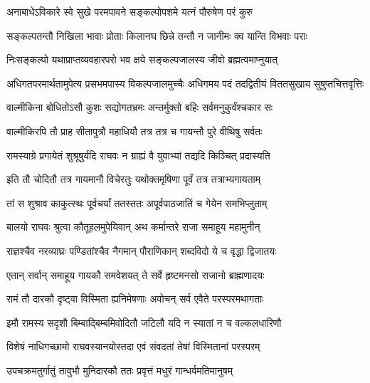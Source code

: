 \twolineshloka
{अनाबाधेऽविकारे स्वे सुखे परमपावने}
{सङ्कल्पोपशमे यत्नं पौरुषेण परं कुरु} %

\twolineshloka
{सङ्कल्पतन्तौ निखिला भावाः प्रोताः किलानघ}
{छिन्ने तन्तौ न जानीमः क्व यान्ति विभवाः पराः} %

\twolineshloka
{निःसङ्कल्पो यथाप्राप्तव्यवहारपरो भव}
{क्षये सङ्कल्पजालस्य जीवो ब्रह्मत्वमाप्नुयात्} %

\fourlineindentedshloka
{अधिगतपरमार्थतामुपेत्य}
{प्रसभमपास्य विकल्पजालमुच्चैः}
{अधिगमय पदं तदद्वितीयं}
{विततसुखाय सुषुप्तचित्तवृत्तिः} %






\twolineshloka
{वाल्मीकिना बोधितोऽसौ कुशः सद्योगतभ्रमः}
{अन्तर्मुक्तो बहिः सर्वमनुकुर्वंश्चकार सः} %

\twolineshloka
{वाल्मीकिरपि तौ प्राह सीतापुत्रौ महाधियौ}
{तत्र तत्र च गायन्तौ पुरे वीथिषु सर्वतः} %

\twolineshloka
{रामस्याग्रे प्रगायेतं शुश्रूषुर्यदि राघवः}
{न ग्राह्यं वै युवाभ्यां तद्यदि किञ्चित् प्रदास्यति} %

\twolineshloka
{इति तौ चोदितौ तत्र गायमानौ विचेरतुः}
{यथोक्तमृषिणा पूर्वं तत्र तत्राभ्यगायताम्} %

\twolineshloka
{तां स शुश्राव काकुत्स्थः पूर्वचर्यां ततस्ततः}
{अपूर्वपाठजातिं च गेयेन समभिप्लुताम्} %

\twolineshloka
{बालयो राघवः श्रुत्वा कौतूहलमुपेयिवान्}
{अथ कर्मान्तरे राजा समाहूय महामुनीन्} %

\twolineshloka
{राज्ञश्चैव नरव्याघ्रः पण्डितांश्चैव नैगमान्}
{पौराणिकान् शब्दविदो ये च वृद्धा द्विजातयः} %

\twolineshloka
{एतान् सर्वान् समाहूय गायकौ समवेशयत्}
{ते सर्वे हृष्टमनसो राजानो ब्राह्मणादयः} %

\twolineshloka
{रामं तौ दारकौ दृष्ट्वा विस्मिता ह्यनिमेषणाः}
{अवोचन् सर्व एवैते परस्परमथागताः} %

\twolineshloka
{इमौ रामस्य सदृशौ बिम्बाद्बिम्बमिवोदितौ}
{जटिलौ यदि न स्यातां न च वल्कलधारिणौ} %

\twolineshloka
{विशेषं नाधिगच्छामो राघवस्यानयोस्तदा}
{एवं संवदतां तेषां विस्मितानां परस्परम्} %

\twolineshloka
{उपचक्रमतुर्गातुं तावुभौ मुनिदारकौ}
{ततः प्रवृत्तं मधुरं गान्धर्वमतिमानुषम्} %

